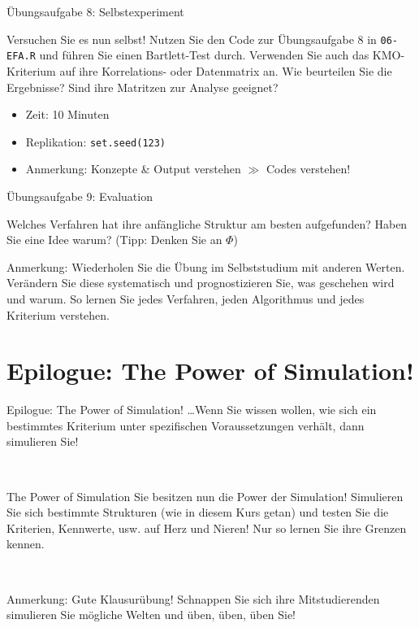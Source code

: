 \documentclass[
  ignorenonframetext,
]{beamer}
\providecommand{\tightlist}{%
  \setlength{\itemsep}{0pt}\setlength{\parskip}{0pt}}
\begin{document}
\begin{frame}{Übungsaufgabe 8: Selbstexperiment}
\protect\hypertarget{uxfcbungsaufgabe-8-selbstexperiment}{}
\begin{example}
Versuchen Sie es nun selbst! Nutzen Sie den Code zur Übungsaufgabe 8 in
\texttt{06-EFA.R} und führen Sie einen Bartlett-Test durch. Verwenden Sie auch
das KMO-Kriterium auf ihre Korrelations- oder Datenmatrix an. Wie beurteilen Sie
die Ergebnisse? Sind ihre Matritzen zur Analyse geeignet?
\end{example}

\begin{itemize}
\tightlist
\item
  Zeit: 10 Minuten
\item
  Replikation: \texttt{set.seed(123)}
\item
  Anmerkung: Konzepte \& Output verstehen \(\gg\) Codes verstehen!
\end{itemize}
\end{frame}

\begin{frame}{Übungsaufgabe 9: Evaluation}
\protect\hypertarget{uxfcbungsaufgabe-9-evaluation}{}
\begin{example}
Welches Verfahren hat ihre anfängliche Struktur am besten aufgefunden? Haben Sie
eine Idee warum? (Tipp: Denken Sie an $\Phi$)
\end{example}

Anmerkung: Wiederholen Sie die Übung im Selbststudium mit anderen
Werten. Verändern Sie diese systematisch und prognostizieren Sie, was
geschehen wird und warum. So lernen Sie jedes Verfahren, jeden
Algorithmus und jedes Kriterium verstehen.
\end{frame}

\hypertarget{epilogue-the-power-of-simulation}{%
\section*{Epilogue: The Power of
Simulation!}\label{epilogue-the-power-of-simulation}}

\begin{frame}{Epilogue: The Power of Simulation!}
\ldots Wenn Sie wissen wollen, wie sich ein bestimmtes Kriterium unter
spezifischen Voraussetzungen verhält, dann simulieren Sie!

~

\begin{alertblock}{The Power of Simulation}
Sie besitzen nun die Power der Simulation! Simulieren Sie sich bestimmte
Strukturen (wie in diesem Kurs getan) und testen Sie die Kriterien, Kennwerte,
usw. auf Herz und Nieren! Nur so lernen Sie ihre Grenzen kennen.
\end{alertblock}

~

Anmerkung: Gute Klausurübung! Schnappen Sie sich ihre Mitstudierenden
simulieren Sie mögliche Welten und üben, üben, üben Sie!
\end{frame}
\end{document}
